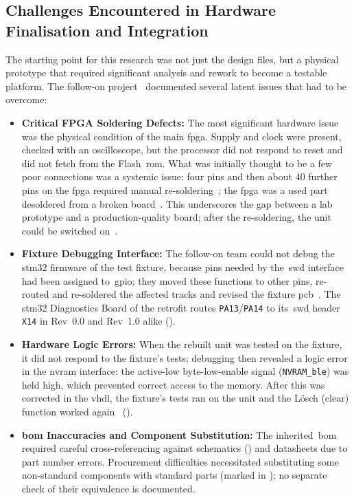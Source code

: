 \subsection{Challenges Encountered in Hardware Finalisation and Integration}
\label{subsec:hardware_challenges}

The starting point for this research was not just the design files, but a physical prototype that required significant analysis and rework to become a testable platform. The follow-on project~\cite[pp.~10--14]{savchuk2025} documented several latent issues that had to be overcome:

\begin{itemize}
	\item \textbf{Critical FPGA Soldering Defects:} The most significant hardware issue was the physical condition of the main \gls{fpga}. Supply and clock were present, checked with an oscilloscope, but the processor did not respond to reset and did not fetch from the Flash~\gls{rom}. What was initially thought to be a few poor connections was a systemic issue: four pins and then about 40 further pins on the \gls{fpga} required manual re-soldering~\cite[p.~13]{savchuk2025}; the \gls{fpga} was a used part desoldered from a broken board~\cite[Sec.~6.2]{leyer2023}. This underscores the gap between a lab prototype and a production-quality board; after the re-soldering, the unit could be switched on~\cite[p.~13]{savchuk2025}.
	\item \textbf{Fixture Debugging Interface:} The follow-on team could not debug the \gls{stm32} firmware of the test fixture, because pins needed by the~\gls{swd} interface had been assigned to~\gls{gpio}; they moved these functions to other pins, re-routed and re-soldered the affected tracks and revised the fixture \gls{pcb}~\cite[pp.~10, 12]{savchuk2025}. The \gls{stm32} Diagnostics Board of the retrofit routes \texttt{PA13}/\texttt{PA14} to its~\gls{swd} header \texttt{X14} in Rev~0.0 and Rev~1.0 alike ().
	\item \textbf{Hardware Logic Errors:} When the rebuilt unit was tested on the fixture, it did not respond to the fixture's tests; debugging then revealed a logic error in the \gls{nvram} interface: the active-low byte-low-enable signal (\texttt{NVRAM\_ble}) was held high, which prevented correct access to the memory. After this was corrected in the \gls{vhdl}, the fixture's tests ran on the unit and the Lösch (clear) function worked again~\cite[p.~14]{savchuk2025} ().
	\item \textbf{\gls{bom} Inaccuracies and Component Substitution:} The inherited~\gls{bom} required careful cross-referencing against schematics () and datasheets due to part number errors. Procurement difficulties necessitated substituting some non-standard components with standard parts (marked in ); no separate check of their equivalence is documented.

\end{itemize}
